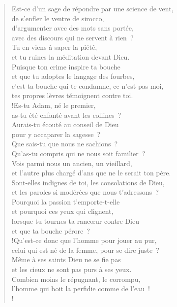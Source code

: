 \documentclass[french,twoside]{book} %
\begin{document}
\begin{verse}
Est-ce d’un sage de répondre par une science de vent, \\
de s’enfler le ventre de sirocco,\\
d’argumenter avec des mots sans portée, \\
avec des discours qui ne servent à rien ?\\
Tu en viens à saper la piété, \\
et tu ruines la méditation devant Dieu.\\
Puisque ton crime inspire ta bouche \\
et que tu adoptes le langage des fourbes,\\
c’est ta bouche qui te condamne, ce n’est pas moi, \\
tes propres lèvres témoignent contre toi.\\!Es-tu Adam, né le premier, \\
as-tu été enfanté avant les collines ?\\
Aurais-tu écouté au conseil de Dieu \\
pour y accaparer la sagesse ?\\
Que sais-tu que nous ne sachions ? \\
Qu’as-tu compris qui ne nous soit familier ?\\
Vois parmi nous un ancien, un vieillard, \\
et l’autre plus chargé d’ans que ne le serait ton père.\\
Sont-elles indignes de toi, les consolations de Dieu, \\
et les paroles si modérées que nous t’adressons ?\\
Pourquoi la passion t’emporte-t-elle \\
et pourquoi ces yeux qui clignent,\\
lorsque tu tournes ta rancœur contre Dieu \\
et que ta bouche pérore ?\\!Qu’est-ce donc que l’homme pour jouer au pur, \\
celui qui est né de la femme, pour se dire juste ?\\
Même à ses saints Dieu ne se fie pas \\
et les cieux ne sont pas purs à ses yeux.\\
Combien moins le répugnant, le corrompu, \\
l’homme qui boit la perfidie comme de l’eau !\\!
\end{verse}
\end{document}
